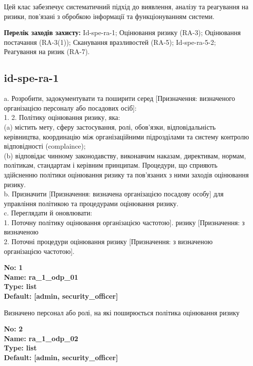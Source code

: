 \documentclass{article}
\begin{document}
Цей клас забезпечує систематичний підхід до виявлення, аналізу та реагування на ризики, пов'язані з обробкою інформації та функціонуванням системи.

\textbf{Перелік заходів захисту:} Id-spe-ra-1; Оцінювання ризику (RA-3); Оцінювання постачання (RA-3(1)); Сканування вразливостей (RA-5); Id-spe-ra-5-2; Реагування на ризик (RA-7).

\subsection{id-spe-ra-1}
a. Розробити, задокументувати та поширити серед [Призначення: визначеного організацією персоналу або посадових осіб]:\\ 
1. 2. Політику оцінювання ризику, яка:\\ 
(a) містить мету, сферу застосування, ролі, обов'язки, відповідальність керівництва, координацію між організаційними підрозділами та систему контролю відповідності (complaince);\\ 
(b) відповідає чинному законодавству, виконавчим наказам, директивам, нормам, політикам, стандартам і керівним принципам. Процедури, що сприяють здійсненню політики оцінювання ризику та пов'язаних з ними заходів оцінювання ризику.\\ 
b. Призначити [Призначення: визначена організацією посадову особу] для управління політикою та процедурами оцінювання ризику.\\ 
c. Переглядати й оновлювати:\\ 
1. Поточну політику оцінювання організацією частотою]. ризику [Призначення: з визначеною\\ 
2. Поточні процедури оцінювання ризику [Призначення: з визначеною організацією частотою].

\vspace{10pt}
{\footnotesize\bfseries
No: 1\\
Name: ra\_\allowbreak{}1\_\allowbreak{}odp\_\allowbreak{}01\\
Type: list\\
Default: [\textquotedbl{}admin\textquotedbl{}, \textquotedbl{}security\_\allowbreak{}officer\textquotedbl{}]
}

{\footnotesize Визначено персонал або ролі, на які поширюється політика оцінювання ризику}


{\footnotesize\bfseries
No: 2\\
Name: ra\_\allowbreak{}1\_\allowbreak{}odp\_\allowbreak{}02\\
Type: list\\
Default: [\textquotedbl{}admin\textquotedbl{}, \textquotedbl{}security\_\allowbreak{}officer\textquotedbl{}]
}
\end{document}
